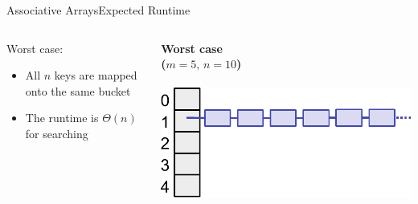 \begin{frame}{Associative Arrays}{Expected Runtime}
  \begin{columns}
    \begin{column}{0.4\linewidth}
      {\color{Mittel-Blau}Worst case}:
      \begin{itemize}
        \item
          All {\color{Mittel-Blau}$n$} keys are mapped onto the same bucket
        \item
          The runtime is {\color{Mittel-Blau}$\Theta(n)$} for searching
      \end{itemize}
    \end{column}
    \begin{column}{0.5\linewidth}
      \begin{center}
        \textbf{Worst case}\\
        \textbf{($m = 5, \, n = 10$)}\\
\ \\
        \includegraphics[height=0.4\textheight]{Images/hash-extreme.pdf}
        \label{tab:hash_table:runtime_worst_case}
      \end{center}
    \end{column}
  \end{columns}
\end{frame}

